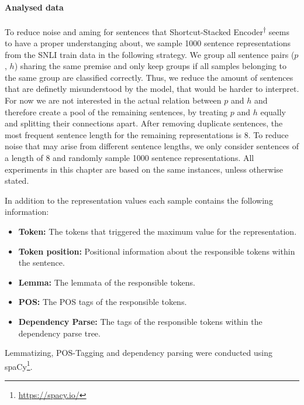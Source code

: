 \paragraph*{Analysed data}\label{sec:understanding1_analysed_data}
To reduce noise and aming for sentences that Shortcut-Stacked Encoder\textsuperscript{$\dagger$} seems to have a proper understanging about, we sample 1000 sentence representations from the \ac{SNLI} train data in the following strategy. We group all sentence pairs ($p$, $h$) sharing the same premise and only keep groups if all samples belonging to the same group are classified correctly. Thus, we reduce the amount of sentences that are definetly misunderstood by the model, that would be harder to interpret. For now we are not interested in the actual relation between $p$ and $h$ and therefore create a pool of the remaining sentences, by treating $p$ and $h$ equally and splitting their connections apart. After removing duplicate sentences, the most frequent sentence length for the remaining representations is 8. To reduce noise that may arise from different sentence lengths, we only consider sentences of a length of 8 and randomly sample 1000 sentence representations. All experiments in this chapter are based on the same instances, unless otherwise stated.
\newline

\noindent
In addition to the representation values each sample contains the following information:
\begin{itemize}
\item \textbf{Token:} The tokens that triggered the maximum value for the representation.
\item \textbf{Token position:} Positional information about the responsible tokens within the sentence.
\item \textbf{Lemma:} The lemmata of the responsible tokens.
\item \textbf{\ac{POS}:} The \ac{POS} tags of the responsible tokens.
\item \textbf{Dependency Parse:} The tags of the responsible tokens within the dependency parse tree.
\end{itemize}
Lemmatizing, \ac{POS}-Tagging and dependency parsing were conducted using spaCy\footnote{\href{https://spacy.io/}{https://spacy.io/}}.

